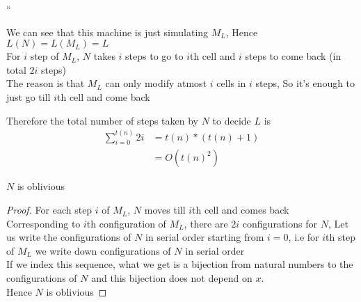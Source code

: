 ``

We can see that this machine is just simulating $M_L$, Hence $L(N) = L(M_L) = L$\\
For $i$ step of $M_L$, $N$ takes $i$ steps to go to $i$th cell and $i$ steps to come back (in total $2i$ steps)\\
The reason is that $M_L$ can only modify atmost $i$ cells in $i$ steps, So it's enough to just go till $i$th cell and come back

Therefore the total number of steps taken by $N$ to decide $L$ is 
\begin{align}
    \sum_{i = 0}^{t(n)} 2i &= t(n) * (t(n) + 1) \\
    &= O(t(n)^2)
\end{align}

\begin{claim}
    $N$ is oblivious
\end{claim}
\begin{proof}
    For each step $i$ of $M_L$, $N$ moves till $i$th cell and comes back\\
    \imp
    Corresponding to $i$th configuration of $M_L$, there are $2i$ configurations for $N$, Let us write the configurations of $N$ in serial order starting from $i = 0$, i.e for $i$th step of $M_L$ we write down configurations of $N$ in serial order\\
    If we index this sequence, what we get is a bijection from natural numbers to the configurations of $N$ and this bijection does not depend on $x$. \\
    Hence $N$ is oblivious
\end{proof}
















